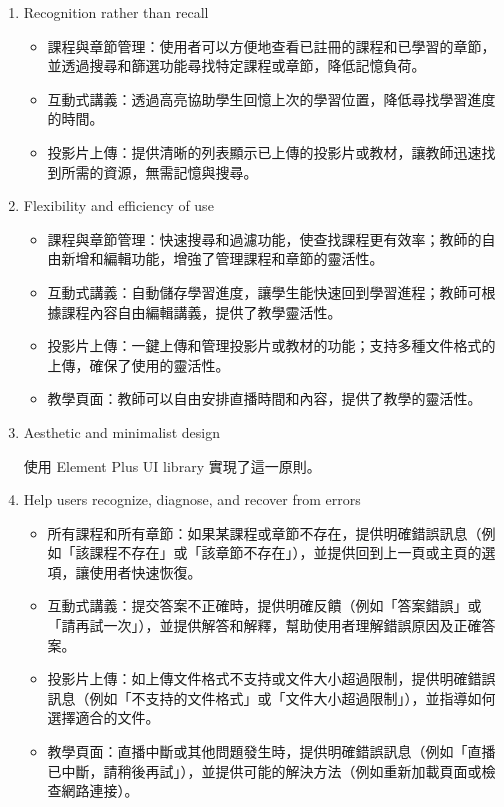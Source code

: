 \documentclass[12pt]{article}
\begin{document}
\begin{enumerate}[label=(\arabic*)]
  \item Recognition rather than recall

  \begin{itemize}
    \item 課程與章節管理：使用者可以方便地查看已註冊的課程和已學習的章節，並透過搜尋和篩選功能尋找特定課程或章節，降低記憶負荷。
    \item 互動式講義：透過高亮協助學生回憶上次的學習位置，降低尋找學習進度的時間。
    \item 投影片上傳：提供清晰的列表顯示已上傳的投影片或教材，讓教師迅速找到所需的資源，無需記憶與搜尋。
  \end{itemize}

  \item Flexibility and efficiency of use

  \begin{itemize}
    \item 課程與章節管理：快速搜尋和過濾功能，使查找課程更有效率；教師的自由新增和編輯功能，增強了管理課程和章節的靈活性。
    \item 互動式講義：自動儲存學習進度，讓學生能快速回到學習進程；教師可根據課程內容自由編輯講義，提供了教學靈活性。
    \item 投影片上傳：一鍵上傳和管理投影片或教材的功能；支持多種文件格式的上傳，確保了使用的靈活性。
    \item 教學頁面：教師可以自由安排直播時間和內容，提供了教學的靈活性。
  \end{itemize}

  \item Aesthetic and minimalist design

  \par 使用 Element Plus UI library 實現了這一原則。

  \item Help users recognize, diagnose, and recover from errors

  \begin{itemize}
    \item 所有課程和所有章節：如果某課程或章節不存在，提供明確錯誤訊息（例如「該課程不存在」或「該章節不存在」），並提供回到上一頁或主頁的選項，讓使用者快速恢復。
    \item 互動式講義：提交答案不正確時，提供明確反饋（例如「答案錯誤」或「請再試一次」），並提供解答和解釋，幫助使用者理解錯誤原因及正確答案。
    \item 投影片上傳：如上傳文件格式不支持或文件大小超過限制，提供明確錯誤訊息（例如「不支持的文件格式」或「文件大小超過限制」），並指導如何選擇適合的文件。
    \item 教學頁面：直播中斷或其他問題發生時，提供明確錯誤訊息（例如「直播已中斷，請稍後再試」），並提供可能的解決方法（例如重新加載頁面或檢查網路連接）。
  \end{itemize}


\end{enumerate}
\end{document}
